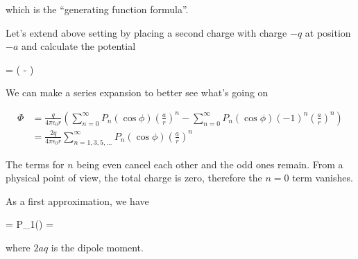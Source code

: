 which is the ``generating function formula''.

Let's extend above setting by placing a second charge with charge $-q$ at position $-a$ and calculate the potential

\bee
\Phi =  \left(  -  \right)
\eee

We can make a series expansion to better see what's going on

\begin{align*}
  \Phi &= \frac{q}{4\pi\epsilon_0 r} \left( \sum_{n=0}^\infty P_n(\cos\phi)\left(\frac{a}{r} \right)^n - \sum_{n=0}^\infty P_n(\cos\phi) (-1)^n \left(\frac{a}{r} \right)^n \right) \\
  &= \frac{2q}{4\pi\epsilon_0 r} \sum_{n=1,3,5,\ldots}^\infty P_n(\cos\phi)\left(\frac{a}{r} \right)^n
\end{align*}

The terms for $n$ being even cancel each other and the odd ones remain. From a physical point of view, the total charge is zero, therefore the $n=0$ term vanishes.

As a first approximation, we have

\bee
\Phi =  P_1(\cos\phi)  =  \cos\phi
\eee

where $2aq$ is the dipole moment.


